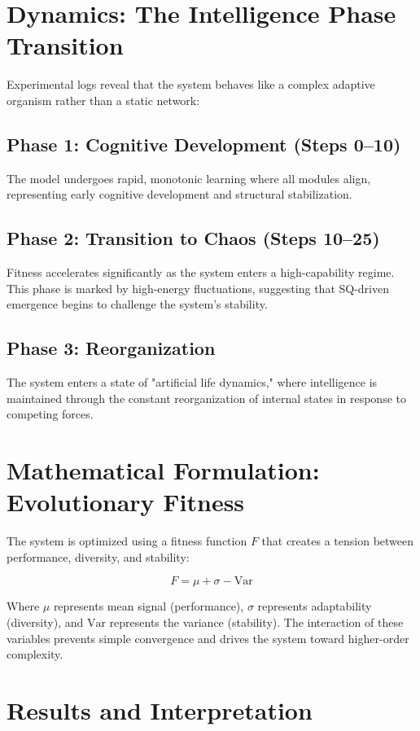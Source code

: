 \documentclass[12pt]{article}
\begin{document}
\section{Dynamics: The Intelligence Phase Transition}

Experimental logs reveal that the system behaves like a complex adaptive organism rather than a static network:

\subsection{Phase 1: Cognitive Development (Steps 0--10)}
The model undergoes rapid, monotonic learning where all modules align, representing early cognitive development and structural stabilization.

\subsection{Phase 2: Transition to Chaos (Steps 10--25)}
Fitness accelerates significantly as the system enters a high-capability regime. This phase is marked by high-energy fluctuations, suggesting that SQ-driven emergence begins to challenge the system's stability.

\subsection{Phase 3: Reorganization}
The system enters a state of "artificial life dynamics," where intelligence is maintained through the constant reorganization of internal states in response to competing forces.

\section{Mathematical Formulation: Evolutionary Fitness}

The system is optimized using a fitness function $F$ that creates a tension between performance, diversity, and stability:

\[
F = \mu + \sigma - \text{Var}
\]

Where $\mu$ represents mean signal (performance), $\sigma$ represents adaptability (diversity), and $\text{Var}$ represents the variance (stability). The interaction of these variables prevents simple convergence and drives the system toward higher-order complexity.

\section{Results and Interpretation}
\end{document}
